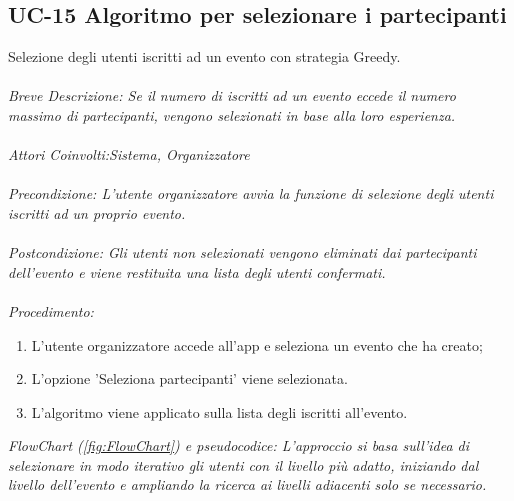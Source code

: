 \subsection{UC-15 Algoritmo per selezionare i partecipanti}
Selezione degli utenti iscritti ad un evento con strategia Greedy.
\\
\\
\textit{Breve Descrizione: Se il numero di iscritti ad un evento eccede il numero massimo di partecipanti, vengono selezionati in base alla loro esperienza.} 
\\
\\
\textit{Attori Coinvolti:Sistema, Organizzatore}
\\
\\
\textit{Precondizione: L'utente organizzatore avvia la funzione di selezione degli utenti iscritti ad un proprio evento.}
\\
\\
\textit{Postcondizione: Gli utenti non selezionati vengono eliminati dai partecipanti dell'evento e viene restituita una lista degli utenti confermati.}
\\
\\
\textit{Procedimento:}
\begin{enumerate}
	\item L'utente organizzatore accede all'app e seleziona un evento che ha creato;
 	\item L'opzione 'Seleziona partecipanti' viene selezionata.
	\item L'algoritmo viene applicato sulla lista degli iscritti all'evento.
\end{enumerate}



\textit{FlowChart (\ref*{fig:FlowChart}) e pseudocodice: L'approccio si basa sull'idea di selezionare in modo iterativo gli utenti con il livello più
adatto, iniziando dal livello dell'evento e ampliando la ricerca ai livelli adiacenti solo se
necessario.}

